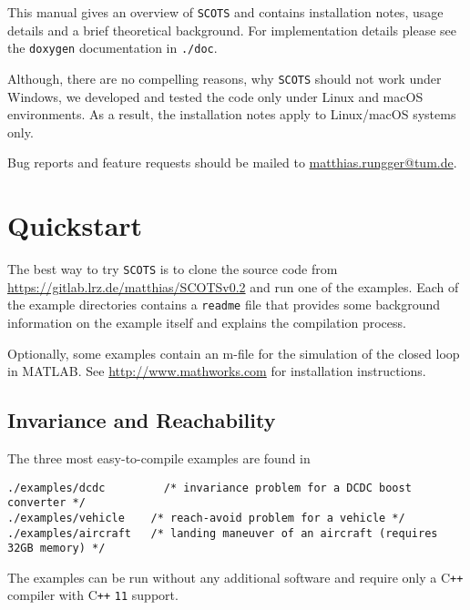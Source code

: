 \documentclass[a4paper]{amsart}
\newcommand\Cpp{C\texttt{++} }
\begin{document}
This manual gives an overview of {\tt SCOTS} and contains installation
notes, usage details and a brief theoretical background. For implementation
details please see the {\tt doxygen} documentation in {\tt ./doc}.

Although, there are no compelling reasons, why {\tt SCOTS} should not work
under Windows, we developed and tested the code only under Linux and macOS
environments. As a result, the installation notes apply to
Linux/macOS systems only. 



Bug reports and feature requests should be mailed to \href{mailto:matthias.rungger@tum.de}{matthias.rungger@tum.de}. 

\section{Quickstart}

The best way to try {\tt SCOTS} is to clone the source code from
\url{https://gitlab.lrz.de/matthias/SCOTSv0.2} and run one of the examples. Each of the
example directories contains a {\tt readme} file that provides some background
information on the example itself and explains the compilation
process. 

Optionally, some examples contain an m-file for the simulation of the
closed loop in MATLAB. See \url{http://www.mathworks.com} for installation
instructions.


\subsection{Invariance and Reachability}

The three most easy-to-compile examples are found in
\begin{lstlisting}[basicstyle=\small\ttfamily]
./examples/dcdc      	/* invariance problem for a DCDC boost converter */ 
./examples/vehicle    /* reach-avoid problem for a vehicle */ 
./examples/aircraft   /* landing maneuver of an aircraft (requires 32GB memory) */ 
\end{lstlisting}
The examples can be run without any additional software and require only a
\Cpp compiler with \Cpp{\tt11} support. 
\end{document}
